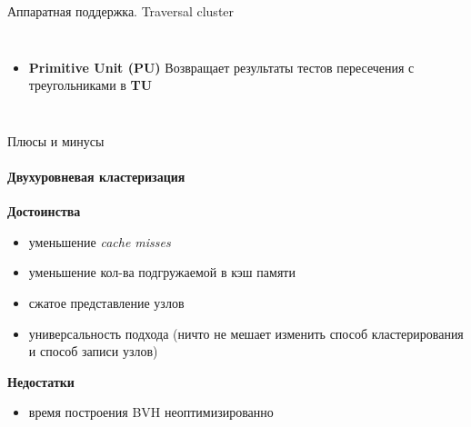 \begin{frame}{Аппаратная поддержка. Traversal cluster}
\begin{columns}
        \begin{itemize}
            \item 
                \textbf{Primitive Unit (PU)}
                Возвращает результаты тестов пересечения с треугольниками в \textbf{TU}
        \end{itemize}

    \end{columns}

\end{frame}

\begin{frame}[t]{Плюсы и минусы}
    \framesubtitle{Двухуровневая кластеризация}
    \textbf{Достоинства}
    \begin{itemize}
        \item
            уменьшение \textit{cache misses}
        \item
            уменьшение кол-ва подгружаемой в кэш памяти
        \item
            сжатое представление узлов
        \item
            универсальность подхода (ничто не мешает изменить
            способ кластерирования и способ записи узлов)
    \end{itemize}
    \textbf{Недостатки}
    \begin{itemize}
        \item
            время построения BVH неоптимизированно
    \end{itemize}
\end{frame}

